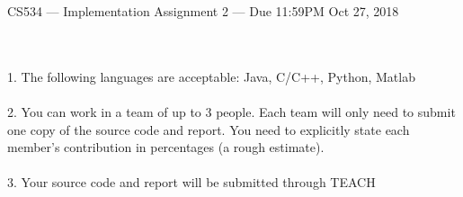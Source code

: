 \documentclass{article}
\begin{document}
{\Large
\begin{center}
CS534 --- Implementation Assignment 2 --- {Due 11:59PM Oct 27, 2018}
\end{center}
}

\\ \\
1. The following languages are acceptable: Java, C/C++, Python, Matlab \\\\
2. You can work in a team of up to 3 people. Each team will only need to submit one copy of the source code and report. You need to explicitly state each member's contribution in percentages (a rough estimate).\\\\
3. Your source code and report will be submitted through TEACH \\\\
\end{document}
